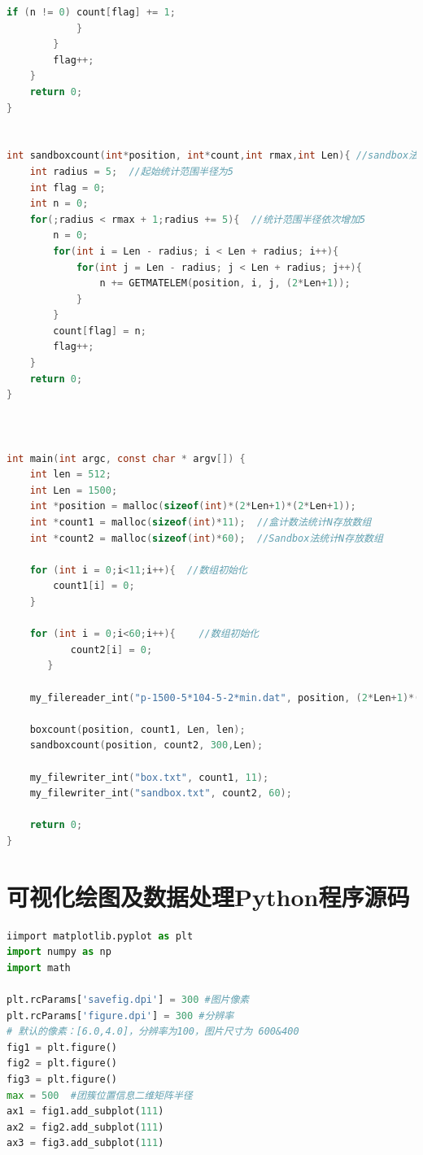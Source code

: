 \documentclass[a4paper,11pt]{article}
\begin{document}
\begin{appendices}
\begin{lstlisting}[language = C]
                if (n != 0) count[flag] += 1;
            }
        }
        flag++;
    }
    return 0;
}


int sandboxcount(int*position, int*count,int rmax,int Len){ //sandbox法统计N，rmax为统计区域的半径最大值，Len为位置二维矩阵的半径
    int radius = 5;  //起始统计范围半径为5
    int flag = 0;
    int n = 0;
    for(;radius < rmax + 1;radius += 5){  //统计范围半径依次增加5
        n = 0;
        for(int i = Len - radius; i < Len + radius; i++){
            for(int j = Len - radius; j < Len + radius; j++){
                n += GETMATELEM(position, i, j, (2*Len+1));
            }
        }
        count[flag] = n;
        flag++;
    }
    return 0;
}



int main(int argc, const char * argv[]) {
 	int len = 512;
    int Len = 1500;
    int *position = malloc(sizeof(int)*(2*Len+1)*(2*Len+1));
    int *count1 = malloc(sizeof(int)*11);  //盒计数法统计N存放数组
    int *count2 = malloc(sizeof(int)*60);  //Sandbox法统计N存放数组
    
    for (int i = 0;i<11;i++){  //数组初始化
        count1[i] = 0;
    }
    
    for (int i = 0;i<60;i++){    //数组初始化
           count2[i] = 0;
       }
    
    my_filereader_int("p-1500-5*104-5-2*min.dat", position, (2*Len+1)*(2*Len+1)); //读取之前生成的位置矩阵

    boxcount(position, count1, Len, len);
    sandboxcount(position, count2, 300,Len);
    
    my_filewriter_int("box.txt", count1, 11);
    my_filewriter_int("sandbox.txt", count2, 60);
          
    return 0;
}	
\end{lstlisting}





\newpage

\section{可视化绘图及数据处理Python程序源码}

\begin{lstlisting}[language = python]
iimport matplotlib.pyplot as plt
import numpy as np
import math

plt.rcParams['savefig.dpi'] = 300 #图片像素
plt.rcParams['figure.dpi'] = 300 #分辨率
# 默认的像素：[6.0,4.0]，分辨率为100，图片尺寸为 600&400
fig1 = plt.figure()
fig2 = plt.figure()
fig3 = plt.figure()
max = 500  #团簇位置信息二维矩阵半径
ax1 = fig1.add_subplot(111)
ax2 = fig2.add_subplot(111)
ax3 = fig3.add_subplot(111)




\end{lstlisting}
\end{appendices}
\end{document}
